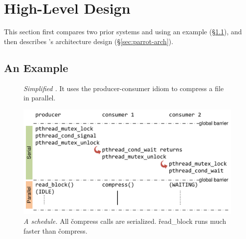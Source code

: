 \section{High-Level Design} \label{sec:parrot-design}

This section first compares two prior systems and \parrot using
an example (\S\ref{sec:parrot-example}), and then describes \parrot's architecture design
(\S\ref{sec:parrot-arch}).

\subsection{An Example} \label{sec:parrot-example}

\begin{figure}[t]
\centering
\begin{minipage}{.5\textwidth}
\end{minipage}
\vspace{-.1in}
\caption{{\em Simplified \pbzip.} It uses the producer-consumer idiom to
  compress a file in parallel.} \label{fig:parrot-example}
\vspace{-.05in}
\end{figure}

\begin{figure}[t]
\centering
\includegraphics[width=\columnwidth]{parrot/figures/dthreads_schedule}
\vspace{-.2in}
\caption{{\em A \dthreads schedule.}  All
  \v{compress} calls are serialized. \v{read\_block} runs much faster than
  \v{compress}.}\label{fig:parrot-dthreads-schedule}
\vspace{-.05in}
\end{figure}

